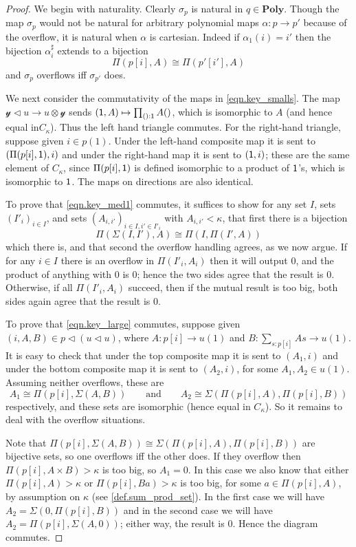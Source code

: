 \documentclass[11pt, one side, article]{memoir}
\theoremstyle{definition}
\theoremstyle{plain}
\newcommand{\Cat}[1]{\mathbf{#1}}%
\newcommand{\yon}{\mathcal{y}}
\newcommand{\poly}{\Cat{Poly}}
\newcommand{\0}{\textsf{0}}
\newcommand{\1}{\tn{\textsf{1}}}
\newcommand{\tri}{\mathbin{\triangleleft}}
\newcommand{\qqand}{\qquad\text{and}\qquad}
\begin{document}
\begin{proof}
We begin with naturality. Clearly $\sigma_p$ is natural in $q\in\poly$. Though the map $\sigma_{p}$ would not be natural for arbitrary polynomial maps $\alpha\colon p\to p'$ because of the overflow, it is natural when $\alpha$ is cartesian. Indeed if $\alpha_1(i)=i'$ then the bijection $\alpha_i^\sharp$ extends to a bijection
\[\Pi(p[i],A)\cong\Pi(p'[i'],A)\]
and $\sigma_p$ overflows iff $\sigma_{p'}$ does.

We next consider the commutativity of the maps in \eqref{eqn.key_smalls}. The map $\yon\tri u\to u\otimes\yon$ sends $(\1,A)\mapsto\prod_{():\1}A()$, which is isomorphic to $A$ (and hence equal in$C_\kappa$). Thus the left hand triangle commutes. For the right-hand triangle, suppose given $i\in p(1)$. Under the left-hand composite map it is sent to $(\Pi(p[i],\1),i)$ and under the right-hand map it is sent to $(\1,i)$; these are the same element of $C_\kappa$, since $\Pi(p[i],\1)$ is defined isomorphic to a product of $\1$'s, which is isomorphic to $\1$. The maps on directions are also identical.

To prove that \eqref{eqn.key_med1} commutes, it suffices to show for any set $I$, sets $(I'_i)_{i\in I}$, and sets $(A_{i,i'})_{i\in I, i'\in I'_i}$ with $A_{i,i'}<\kappa$, that first there is a bijection
\[\Pi(\Sigma(I,I'),A)\cong\Pi(I,\Pi(I',A))\]
which there is, and that second the overflow handling agrees, as we now argue. If for any $i\in I$ there is an overflow in $\Pi(I'_i,A_i)$ then it will output $0$, and the product of anything with $0$ is $0$; hence the two sides agree that the result is $0$. Otherwise, if all $\Pi(I'_i,A_i)$ succeed, then if the mutual result is too big, both sides again agree that the result is $0$. 

To prove that \eqref{eqn.key_large} commutes, suppose given $(i,A,B)\in p\tri(u\tri u)$, where $A\colon p[i]\to u(1)$ and $B\colon\sum_{s:p[i]}As\to u(1)$. It is easy to check that under the top composite map it is sent to  $(A_1,i)$ and under the bottom composite map it is sent to $(A_2,i)$, for some $A_1,A_2\in u(1)$. Assuming neither overflows, these are 
\[
  A_1\cong\Pi(p[i],\Sigma(A, B))
  \qqand
	A_2\cong\Sigma(\Pi(p[i],A),\Pi(p[i],B))
\] 
respectively, and these sets are isomorphic (hence equal in $C_\kappa$). So it remains to deal with the overflow situations.

Note that $\Pi(p[i],\Sigma(A, B))\cong\Sigma(\Pi(p[i],A),\Pi(p[i],B))$ are bijective sets, so one overflows iff the other does. If they overflow then $\Pi(p[i],A\times B)>\kappa$ is too big, so $A_1=0$. In this case we also know that either $\Pi(p[i],A)>\kappa$ or $\Pi(p[i],Ba)>\kappa$ is too big, for some $a\in\Pi(p[i],A)$, by assumption on $\kappa$ (see \cref{def.sum_prod_set}). In the first case we will have $A_2=\Sigma(0,\Pi(p[i],B))$ and in the second case we will have $A_2=\Pi(p[i],\Sigma(A, 0))$; either way, the result is $0$. Hence the diagram commutes.


\end{proof}
\end{document}
